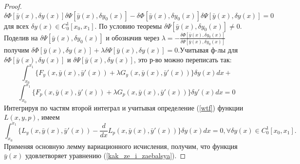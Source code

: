 \begin{proof}
    $$\delta \Phi[\bar y(x), \delta y(x)]\delta \Psi[\bar y(x), \delta y_0(x)] - \delta \Phi[\bar y(x), \delta y_0(x)]\delta\Psi[\bar y(x), \delta y(x)] = 0$$
    для всех $\delta y(x) \in C^1_0[x_0, x_1]$. По условию теоремы $\delta\Psi[\bar y(x), \delta y_0(x)] \neq 0$. Поделив на $\delta \Psi[\bar y(x), \delta y_0(x)]$ и обозначив через $\lambda=-\frac{\delta\Phi[\bar y(x), \delta y_0(x)]}{\delta\Psi[\bar y(x), \delta y_0(x)]}$ получим $\delta\Phi[\bar y(x), \delta y(x)] + \lambda\delta\Psi[\bar y(x), \delta y(x)] = 0$.Учитывая ф-лы для $\delta\Phi[\bar y(x),\delta y(x)]$ и $\delta\Psi[\bar y(x), \delta y(x)]$, это р-во можно переписать так:
    $$\int_{x_0}^{x_1}\Big\{ F_y(x, \bar y(x), \bar y'(x)) + \lambda G_y(x, \bar y(x), \bar y'(x))\Big\}\delta y(x)dx+$$
    $$\int_{x_0}^{x_1}\Big\{ F_p(x, \bar y(x), \bar y'(x)) + \lambda G_p(x, \bar y(x), \bar y'(x))\Big\}\delta y'(x)dx=0$$
    Интегрируя по частям второй интеграл и учитывая определение (\ref{wtf}) функции $L(x, y, p)$, имеем
    $$\int_{x_0}^{x_1} \Big\{ L_y(x,\bar y(x),\bar y'(x)) - \frac{d}{dx} L_p(x,\bar y(x),\bar y'(x))\Big\}\delta y(x)dx = 0, \forall\delta y(x) \in C^1_0[x_0, x_1].$$
    Применяя основную лемму вариационного исчисления, получим, что функция $\bar y(x)$ удовлетворяет уравнению (\ref{kak_ze_i_zaebalsya}).
    
\end{proof}
